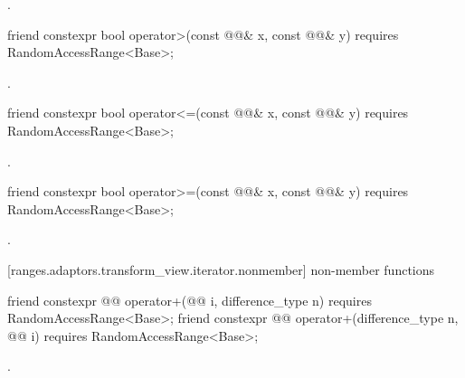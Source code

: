 \begin{itemdescr}
\pnum
\returns {}.
\end{itemdescr}

%
\begin{itemdecl}
friend constexpr bool operator>(const @@& x, const @@& y)
  requires RandomAccessRange<Base>;
\end{itemdecl}

\begin{itemdescr}
\pnum
\returns {}.
\end{itemdescr}

%
\begin{itemdecl}
friend constexpr bool operator<=(const @@& x, const @@& y)
  requires RandomAccessRange<Base>;
\end{itemdecl}

\begin{itemdescr}
\pnum
\returns {}.
\end{itemdescr}

%
\begin{itemdecl}
friend constexpr bool operator>=(const @@& x, const @@& y)
  requires RandomAccessRange<Base>;
\end{itemdecl}

\begin{itemdescr}
\pnum
\returns {}.
\end{itemdescr}

[ranges.adaptors.transform_view.iterator.nonmember]{ non-member functions}

\begin{itemdecl}
friend constexpr @@ operator+(@@ i, difference_type n)
  requires RandomAccessRange<Base>;
friend constexpr @@ operator+(difference_type n, @@ i)
  requires RandomAccessRange<Base>;
\end{itemdecl}

\begin{itemdescr}
\pnum
\returns {}.
\end{itemdescr}

